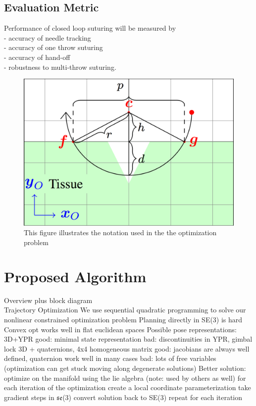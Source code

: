 \subsection{Evaluation Metric}
Performance of closed loop suturing will be measured by\\
- accuracy of needle tracking \\
- accuracy of one throw suturing \\
- accuracy of hand-off \\
- robustness to multi-throw suturing.


\begin{figure}[!t]
\centering
\includegraphics[width=0.8\linewidth]{figures/Schematic}
\caption{ This figure illustrates the notation used in the the optimization problem }
\label{fig:notation}
\vspace{-10pt}
\end{figure}


\section{Proposed Algorithm}
\label{sec:approach}
Overview plus block diagram \\

Trajectory Optimization
We use sequential quadratic programming to solve our nonlinear constrained optimization problem
Planning directly in SE(3) is hard
Convex opt works well in flat euclidean spaces
Possible pose representations:
3D+YPR
good: minimal state representation
bad: discontinuities in YPR, gimbal lock
3D + quaternions, 4x4 homogeneous matrix
good: jacobians are always well defined, quaternion work well in many cases
bad: lots of free variables (optimization can get stuck moving along degenerate solutions)
Better solution: optimize on the manifold using the lie algebra (note: used by others as well)
for each iteration of the optimization create a local coordinate parameterization
take gradient steps in $\mathfrak{se}$(3)
convert solution back to SE(3)
repeat for each iteration

